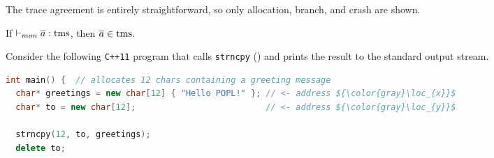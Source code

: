 \documentclass[utf8,acmsmall,review,screen,dvipsnames,anonymous]{acmart}
\begin{document}
The trace agreement is entirely straightforward, so only allocation, branch, and crash are shown.

\begin{lemma}\label{lem:mon:tmssafe}
  If $\vdash_{mon}{\overline{a}}:{\operatorname{tms}}$, then $\overline{a}\in\operatorname{tms}$. %
\end{lemma}

\begin{example}
  Consider the following \texttt{C++11} program that calls \texttt{strncpy} () and prints the result to the standard output stream.

  \begin{lstlisting}[language=c++,basicstyle=\small\ttfamily,mathescape,commentstyle=\color{gray}]
int main() {  // allocates 12 chars containing a greeting message
  char* greetings = new char[12] { "Hello POPL!" }; // <- address ${\color{gray}\loc_{x}}$
  char* to = new char[12];                          // <- address ${\color{gray}\loc_{y}}$

  strncpy(12, to, greetings);
  delete to;


\end{lstlisting}
\end{example}
\end{document}
